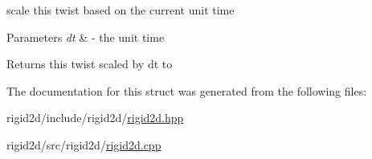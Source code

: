 scale this twist based on the current unit time 


\begin{DoxyParams}{Parameters}
{\em dt} & -\/ the unit time \\
\hline
\end{DoxyParams}
\begin{DoxyReturn}{Returns}
this twist scaled by dt to 
\end{DoxyReturn}


The documentation for this struct was generated from the following files\+:\begin{DoxyCompactItemize}
\item 
rigid2d/include/rigid2d/\hyperlink{rigid2d_8hpp}{rigid2d.\+hpp}\item 
rigid2d/src/rigid2d/\hyperlink{rigid2d_8cpp}{rigid2d.\+cpp}\end{DoxyCompactItemize}
